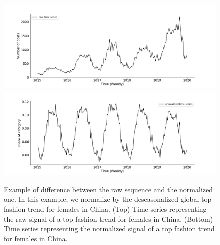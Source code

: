 \documentclass[lettersize,journal]{IEEEtran}
\begin{document}
\begin{figure}
\centering
  \includegraphics[width=1.\linewidth]{figure/cn_female_top_raw}
  \includegraphics[width=1.\linewidth]{figure/cn_female_top_norm}
\caption{Example of difference between the raw sequence and the normalized one. In this example, we normalize by the deseasonalized global top fashion trend for females in China. (Top) Time series representing the raw signal of a top fashion trend for females in China. (Bottom) Time series representing the normalized signal of a top fashion trend for females in China.}
\label{fig:normalization}
\end{figure}
\end{document}
